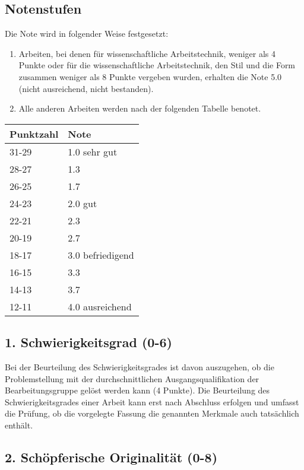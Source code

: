 \documentclass[12pt]{scrartcl}
\begin{document}
\subsection*{Notenstufen}

Die Note wird in folgender Weise festgesetzt:
\begin{enumerate}
	\item  Arbeiten, bei denen für wissenschaftliche Arbeitstechnik, weniger als 4 Punkte oder für die wissenschaftliche Arbeitstechnik, den Stil und die Form zusammen weniger als 8 Punkte vergeben wurden, erhalten die Note 5.0 (nicht ausreichend, nicht bestanden).

	\item 	Alle anderen Arbeiten werden nach der folgenden Tabelle benotet.
\end{enumerate}

\begin{center}
	\begin{tabular}{lp{8cm}}
	\hline
	Punktzahl  & Note \\
	\hline
	31-29 &   1.0 \quad  sehr gut\\
	28-27 &   1.3\\
	\hline
	26-25 &   1.7\\
	24-23 &   2.0 \quad  gut\\
	22-21 &   2.3\\
	\hline
	20-19 &   2.7 \\
	18-17 &   3.0 \quad  befriedigend\\
	16-15 &   3.3\\
	\hline
	14-13 &   3.7\\
	12-11 &   4.0 \quad  ausreichend\\
	\hline
	\end{tabular}
\end{center}

\subsection*{1. Schwierigkeitsgrad (0-6)}

Bei der Beurteilung des Schwierigkeitsgrades ist davon auszugehen, ob die Problemstellung mit der durchschnittlichen Ausgangsqualifikation der Bearbeitungsgruppe gelöst werden kann (4 Punkte). Die Beurteilung des Schwierigkeitsgrades einer Arbeit kann erst nach Abschluss erfolgen und umfasst die Prüfung, ob die vorgelegte Fassung die genannten Merkmale auch tatsächlich enthält.

\subsection*{2. Schöpferische Originalität (0-8)}
\end{document}
